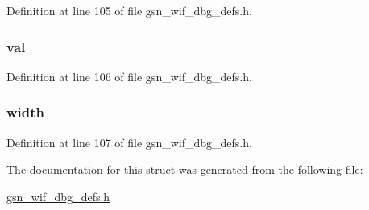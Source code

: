 Definition at line 105 of file gsn\_\-wif\_\-dbg\_\-defs.h.

\hypertarget{a00333_a54d851e570e606ab36dbbae21f7f0095}{
\subsubsection[{val}]{ {\bf val}}}
\label{a00333_a54d851e570e606ab36dbbae21f7f0095}


Definition at line 106 of file gsn\_\-wif\_\-dbg\_\-defs.h.

\hypertarget{a00333_a3c22ff514988933119b1154530e70d02}{
\subsubsection[{width}]{ {\bf width}}}
\label{a00333_a3c22ff514988933119b1154530e70d02}


Definition at line 107 of file gsn\_\-wif\_\-dbg\_\-defs.h.



The documentation for this struct was generated from the following file:\begin{DoxyCompactItemize}
\item 
\hyperlink{a00609}{gsn\_\-wif\_\-dbg\_\-defs.h}\end{DoxyCompactItemize}
